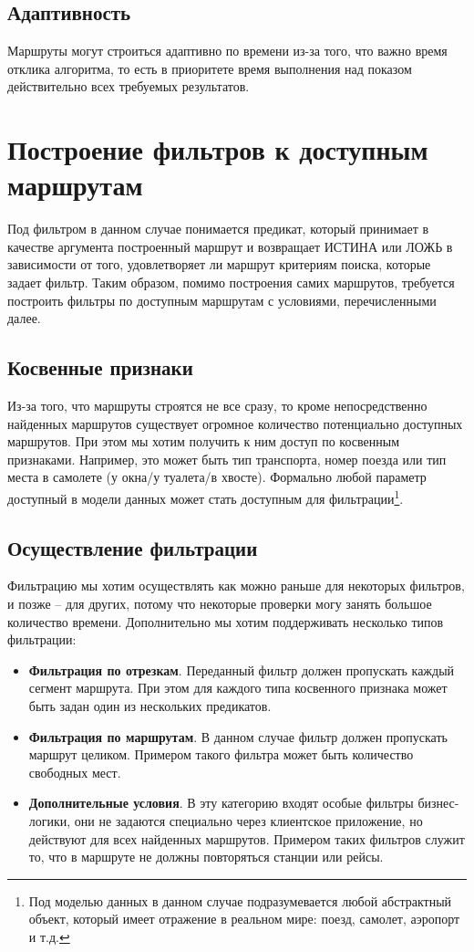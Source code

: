 \subsection{Адаптивность}
Маршруты могут строиться адаптивно по времени из-за того, что важно время отклика алгоритма, то есть в приоритете время выполнения над показом действительно всех требуемых результатов.

\section{Построение фильтров к доступным маршрутам}
Под фильтром в данном случае понимается предикат, который принимает в качестве аргумента построенный маршрут и возвращает ИСТИНА или ЛОЖЬ в зависимости от того, удовлетворяет ли маршрут критериям поиска, которые задает фильтр.
Таким образом, помимо построения самих маршрутов, требуется построить фильтры по доступным маршрутам с условиями, перечисленными далее.

\subsection{Косвенные признаки}
Из-за того, что маршруты строятся не все сразу, то кроме непосредственно найденных маршрутов существует огромное количество потенциально доступных маршрутов. При этом мы хотим получить к ним доступ по косвенным признаками. Например, это может быть тип транспорта, номер поезда или тип места в самолете (у окна/у туалета/в хвосте). Формально любой параметр доступный в модели данных может стать доступным для фильтрации\footnote{Под моделью данных в данном случае подразумевается любой абстрактный объект, который имеет отражение в реальном мире: поезд, самолет, аэропорт и т.д.}.

\subsection{Осуществление фильтрации}
Фильтрацию мы хотим осуществлять как можно раньше для некоторых фильтров, и позже -- для других, потому что некоторые проверки могу занять большое количество времени. Дополнительно мы хотим поддерживать несколько типов фильтрации:
\begin{itemize}
	\item \textbf{Фильтрация по отрезкам}. Переданный фильтр должен пропускать каждый сегмент маршрута. При этом для каждого типа косвенного признака может быть задан один из нескольких предикатов.
	\item \textbf{Фильтрация по маршрутам}. В данном случае фильтр должен пропускать маршрут целиком. Примером такого фильтра может быть количество свободных мест.
	\item \textbf{Дополнительные условия}. В эту категорию входят особые фильтры бизнес-логики, они не задаются специально через клиентское приложение, но действуют для всех найденных маршрутов. Примером таких фильтров служит то, что в маршруте не должны повторяться станции или рейсы.
\end{itemize}

